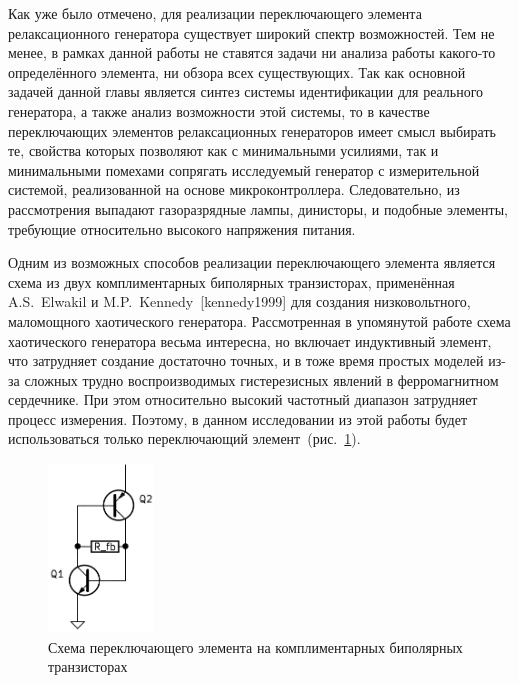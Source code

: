 Как уже было отмечено, для реализации переключающего элемента релаксационного генератора
существует широкий спектр возможностей. Тем не менее, в рамках данной работы
не ставятся задачи ни анализа работы какого-то определённого элемента,
ни обзора всех существующих. Так как основной задачей данной главы является
синтез системы идентификации для реального генератора, а также
анализ возможности этой системы, то в качестве
переключающих элементов релаксационных генераторов имеет смысл выбирать
те, свойства которых позволяют как с минимальными усилиями,
так и минимальными помехами сопрягать исследуемый генератор
с измерительной системой, реализованной на основе микроконтроллера.
Следовательно, из рассмотрения выпадают газоразрядные лампы,
динисторы, и подобные элементы, требующие относительно
высокого напряжения питания.

Одним из возможных способов реализации переключающего элемента
является схема из двух комплиментарных биполярных транзисторах,
применённая A.S.~Elwakil и M.P.~Kennedy~[kennedy1999]
для создания низковольтного, маломощного хаотического генератора.
Рассмотренная в упомянутой работе схема хаотического генератора
весьма интересна, но включает индуктивный элемент,
что затрудняет создание достаточно точных, и в тоже время простых моделей
из-за сложных трудно воспроизводимых гистерезисных явлений в
ферромагнитном сердечнике. При этом относительно высокий частотный диапазон
затрудняет процесс измерения. Поэтому, в данном исследовании
из этой работы будет использоваться только переключающий элемент~(рис.~\ref{atu:f:relax3d_switch}).

\begin{figure}[htb!]
  \centerline{\includegraphics[width=0.25\textwidth]{p/relax3d_switch.png} }
  \caption{Схема переключающего элемента на комплиментарных биполярных транзисторах}
  \label{atu:f:relax3d_switch}
\end{figure}




